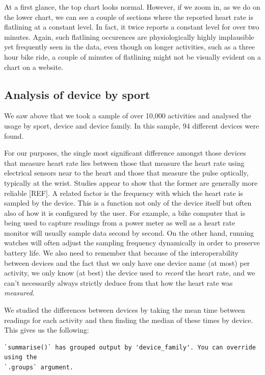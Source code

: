 \documentclass[
  letterpaper,
  DIV=11,
  numbers=noendperiod]{scrartcl}
\begin{document}
At a first glance, the top chart looks normal. However, if we zoom in,
as we do on the lower chart, we can see a couple of sections where the
reported heart rate is flatlining at a constant level. In fact, it twice
reports a constant level for over two minutes. Again, such flatlining
occurences are physiologically highly implausible yet frequently seen in
the data, even though on longer activities, such as a three hour bike
ride, a couple of minutes of flatlining might not be visually evident on
a chart on a website.

\subsection{Analysis of device by
sport}\label{analysis-of-device-by-sport}

We saw above that we took a sample of over 10,000 activities and
analysed the usage by sport, device and device family. In this sample,
94 different devices were found.

For our purposes, the single most significant difference amongst those
devices that measure heart rate lies between those that measure the
heart rate using electrical sensors near to the heart and those that
measure the pulse optically, typically at the wrist. Studies appear to
show that the former are generally more reliable {[}REF{]}. A related
factor is the frequency with which the heart rate is sampled by the
device. This is a function not only of the device itself but often also
of how it is configured by the user. For example, a bike computer that
is being used to capture readings from a power meter as well as a heart
rate monitor will usually sample data second by second. On the other
hand, running watches will often adjust the sampling frequency
dynamically in order to preserve battery life. We also need to remember
that because of the interoperability between devices and the fact that
we only have one device name (at most) per activity, we only know (at
best) the device used to \emph{record} the heart rate, and we can't
necessarily always strictly deduce from that how the heart rate was
\emph{measured}.

We studied the differences between devices by taking the mean time
between readings for each activity and then finding the median of these
times by device. This gives us the following:

\begin{verbatim}
`summarise()` has grouped output by 'device_family'. You can override using the
`.groups` argument.
\end{verbatim}
\end{document}
